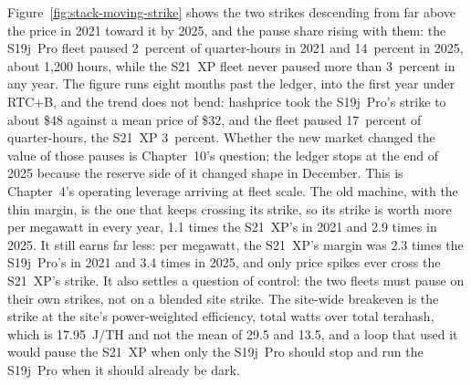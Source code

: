 Figure~\ref{fig:stack-moving-strike} shows the two strikes descending from far above the price in 2021 toward it by 2025, and the pause share rising with them: the S19j~Pro fleet paused 2~percent of quarter-hours in 2021 and 14~percent in 2025, about 1,200 hours, while the S21~XP fleet never paused more than 3~percent in any year. %
The figure runs eight months past the ledger, into the first year under RTC+B, and the trend does not bend: hashprice took the S19j~Pro's strike to about \$48 against a mean price of \$32, and the fleet paused 17~percent of quarter-hours, the S21~XP 3~percent. Whether the new market changed the value of those pauses is Chapter~10's question; the ledger stops at the end of 2025 because the reserve side of it changed shape in December. %
This is Chapter~4's operating leverage arriving at fleet scale. The old machine, with the thin margin, is the one that keeps crossing its strike, so its strike is worth more per megawatt in every year, 1.1 times the S21~XP's in 2021 and 2.9 times in 2025. It still earns far less: per megawatt, the S21~XP's margin was 2.3 times the S19j~Pro's in 2021 and 3.4 times in 2025, and only price spikes ever cross the S21~XP's strike. %
It also settles a question of control: the two fleets must pause on their own strikes, not on a blended site strike. The site-wide breakeven is the strike at the site's power-weighted efficiency, total watts over total terahash, which is 17.95~J/TH and not the mean of 29.5 and 13.5, and a loop that used it would pause the S21~XP when only the S19j~Pro should stop and run the S19j~Pro when it should already be dark. %

